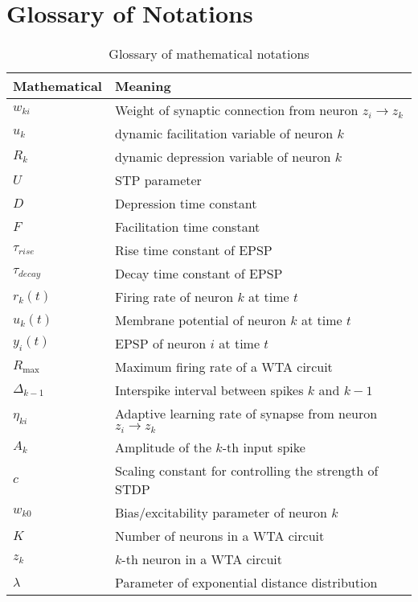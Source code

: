 
\chapter{Glossary of Notations} %

\label{AppendixX} %
\begin{table}[htbp]
\begin{tabular}{|l|l|}
\hline
Mathematical   & Meaning                                                 \\
\hline
$w_{ki}$       & Weight of synaptic connection from neuron $z_i\rightarrow z_k$     \\
$u_k$          & dynamic facilitation variable of neuron $k$             \\
$R_k$          & dynamic depression variable of neuron $k$               \\
$U$            & STP parameter                                           \\
$D$            & Depression time constant                                \\
$F$            & Facilitation time constant                              \\
$\tau_{rise}$  & Rise time constant of EPSP                              \\
$\tau_{decay}$ & Decay time constant of EPSP                             \\
$r_k(t)$       & Firing rate of neuron $k$ at time $t$                   \\
$u_k(t)$       & Membrane potential of neuron $k$ at time $t$            \\
$y_i(t)$       & EPSP of neuron $i$ at time $t$                          \\
$R_{\max}$     & Maximum firing rate of a WTA circuit                    \\
$\Delta_{k-1}$ & Interspike interval between spikes $k$ and $k-1$        \\
$\eta_{ki}$    & Adaptive learning rate of synapse from neuron $z_i\rightarrow z_k$ \\
$A_{k}$        & Amplitude of the $k$-th input spike                     \\
$c$            & Scaling constant for controlling the strength of STDP   \\
$w_{k0}$       & Bias/excitability parameter of neuron $k$               \\
$K$            & Number of neurons in a WTA circuit                      \\ 
$z_k$          & $k$-th neuron in a WTA circuit                          \\
$\lambda$      & Parameter of exponential distance distribution          \\
\hline
\end{tabular}
\caption{Glossary of mathematical notations}
\label{tab:mathematical_notations}
\end{table}

